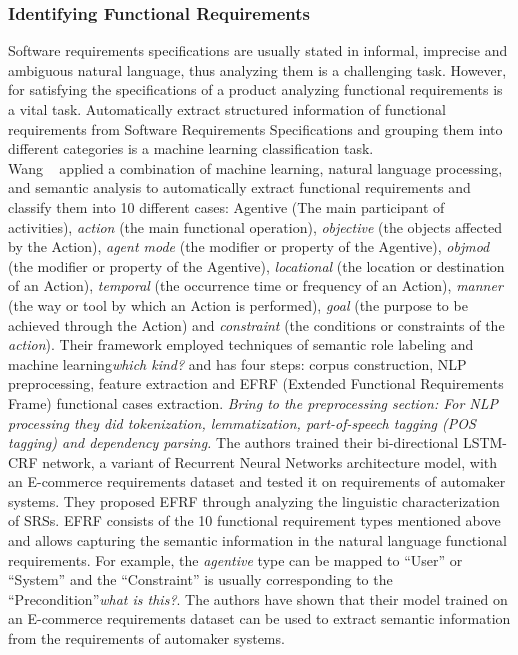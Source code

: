 \subsubsection{Identifying Functional Requirements}

Software requirements specifications are usually stated in informal, imprecise and ambiguous natural language, thus analyzing them is a challenging task. However, for satisfying the specifications of a product analyzing functional requirements is a vital task. Automatically extract structured information of functional requirements from Software Requirements Specifications and grouping them into different categories is a machine learning classification task\cite{7949577}. \\

Wang \etal~\cite{7949577} applied a combination of machine learning, natural
language processing, and semantic analysis to automatically extract functional
requirements and classify them into 10 different cases: Agentive (The main
participant of activities), \emph{action} (the main functional operation),
 \emph{objective} (the objects affected by the Action), \emph{agent mode} (the
 modifier or property of the Agentive), \emph{objmod} (the modifier or property
 of the Agentive), \emph{locational} (the location or
 destination of an Action), \emph{temporal} (the occurrence time or frequency of
 an Action), \emph{manner} (the way or tool by which an Action is performed),
 \emph{goal} (the purpose to be achieved through the Action) and
 \emph{constraint} (the conditions or constraints of the  \emph{action}). Their
 framework employed techniques of semantic role labeling and
 machine learning\emph{which kind?} and has four steps: corpus construction, NLP
 preprocessing, feature extraction and EFRF (Extended Functional Requirements
 Frame) functional cases extraction.
 \emph{Bring to the preprocessing section: For NLP processing they did
 tokenization, lemmatization, part-of-speech tagging (POS tagging) and
 dependency parsing.} The authors trained their bi-directional LSTM-CRF network,
 a variant of Recurrent Neural Networks architecture model, with an E-commerce
 requirements dataset and tested it on requirements of automaker systems. They
 proposed EFRF through analyzing the linguistic characterization of
 SRSs. EFRF consists of the 10 functional requirement types mentioned
 above and allows capturing the semantic information in the natural language
 functional requirements. For example, the \emph{agentive} type can be mapped
 to “User” or “System” and the “Constraint” is usually corresponding to the
 “Precondition”\emph{what is this?}. The authors have shown that their
 model trained on an E-commerce requirements dataset can be used to extract
 semantic information from the requirements of automaker systems.

